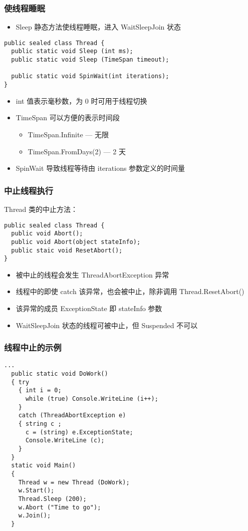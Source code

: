 \begin{frame}[fragile]
\frametitle{使线程睡眠}
\begin{itemize}
\item Sleep 静态方法使线程睡眠，进入 WaitSleepJoin 状态
\end{itemize}
\begin{lstlisting}
public sealed class Thread {
  public static void Sleep (int ms);
  public static void Sleep (TimeSpan timeout);

  public static void SpinWait(int iterations);
}
\end{lstlisting}
\begin{itemize}
\item int 值表示毫秒数，为 0 时可用于线程切换
\item TimeSpan 可以方便的表示时间段
\begin{itemize}
\item TimeSpan.Infinite --- 无限
\item TimeSpan.FromDays(2) --- 2 天
\end{itemize}
\item SpinWait 导致线程等待由 iterations 参数定义的时间量
\end{itemize}
\end{frame}

\begin{frame}[fragile]
\frametitle{中止线程执行}
Thread 类的中止方法：
\begin{lstlisting}
public sealed class Thread {
  public void Abort();
  public void Abort(object stateInfo);
  public staic void ResetAbort();
}
\end{lstlisting}
\begin{itemize}
\item 被中止的线程会发生 ThreadAbortException 异常
\item 线程中的即使 catch 该异常，也会被中止，除非调用 Thread.ResetAbort()
\item 该异常的成员 ExceptionState 即 stateInfo 参数
\item WaitSleepJoin 状态的线程可被中止，但 Suspended 不可以
\end{itemize}
\end{frame}

\begin{frame}
\frametitle{线程中止的示例}
\begin{lstlisting}
...
  public static void DoWork()
  { try
    { int i = 0;
      while (true) Console.WriteLine (i++);
    }
    catch (ThreadAbortException e)
    { string c ;
      c = (string) e.ExceptionState;
      Console.WriteLine (c);
    }
  }
  static void Main()
  {
    Thread w = new Thread (DoWork);
    w.Start();
    Thread.Sleep (200);
    w.Abort ("Time to go");
    w.Join();
  }
\end{lstlisting}
\end{frame}

